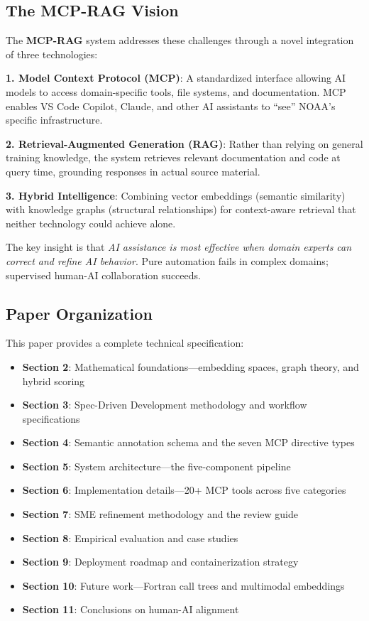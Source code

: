 \documentclass[11pt,letterpaper]{article}
\begin{document}
\subsection{The MCP-RAG Vision}

The \textbf{MCP-RAG} system addresses these challenges through a novel integration of three technologies:

\textbf{1. Model Context Protocol (MCP)}: A standardized interface allowing AI models to access domain-specific tools, file systems, and documentation. MCP enables VS Code Copilot, Claude, and other AI assistants to ``see'' NOAA's specific infrastructure.

\textbf{2. Retrieval-Augmented Generation (RAG)}: Rather than relying on general training knowledge, the system retrieves relevant documentation and code at query time, grounding responses in actual source material.

\textbf{3. Hybrid Intelligence}: Combining vector embeddings (semantic similarity) with knowledge graphs (structural relationships) for context-aware retrieval that neither technology could achieve alone.

The key insight is that \textit{AI assistance is most effective when domain experts can correct and refine AI behavior}. Pure automation fails in complex domains; supervised human-AI collaboration succeeds.

\subsection{Paper Organization}

This paper provides a complete technical specification:

\begin{itemize}
    \item \textbf{Section 2}: Mathematical foundations---embedding spaces, graph theory, and hybrid scoring
    \item \textbf{Section 3}: Spec-Driven Development methodology and workflow specifications
    \item \textbf{Section 4}: Semantic annotation schema and the seven MCP directive types
    \item \textbf{Section 5}: System architecture---the five-component pipeline
    \item \textbf{Section 6}: Implementation details---20+ MCP tools across five categories
    \item \textbf{Section 7}: SME refinement methodology and the review guide
    \item \textbf{Section 8}: Empirical evaluation and case studies
    \item \textbf{Section 9}: Deployment roadmap and containerization strategy
    \item \textbf{Section 10}: Future work---Fortran call trees and multimodal embeddings
    \item \textbf{Section 11}: Conclusions on human-AI alignment
\end{itemize}
\end{document}
